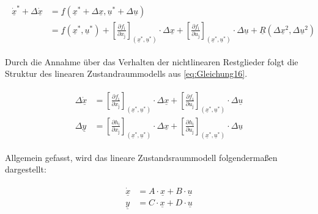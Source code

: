 \documentclass[
	pagesize,
	fontsize=12pt,
	paper=a4,
	oneside,
   reqno
]{scrartcl}
\begin{document}
\begin{align}\label{eq:Gleichung27}
    \begin{split}
        \dot{\underline{x}}^{*}+\Delta{\dot{\underline{x}}} &=\underline{f}(\underline{x}^{*}+\Delta{\underline{x}},\underline{u}^{*}+\Delta{\underline{u}})\\
        &=\underline{f}(\underline{x}^{*},\underline{u}^{*})+\left[\frac{\partial f_{\mathrm{i}}}{\partial x_{\mathrm{j}}}\right]_{(\underline{x}^{*}, \underline{u}^{*})}\cdot\Delta{\underline{x}}+\left[\frac{\partial f_{\mathrm{i}}}{\partial u_{\mathrm{j}}}\right]_{(\underline{x}^{*},\underline{u}^{*})}\cdot\Delta{\underline{u}}+\underline{R}(\Delta{\underline{x}^2}, \Delta{\underline{u}^2})
    \end{split}
\end{align}

Durch die Annahme über das Verhalten der nichtlinearen Restglieder folgt die Struktur des linearen Zustandraummodells aus \autoref{eq:Gleichung16}.

\begin{align}\label{eq:Gleichung28}
    \begin{split}
        \Delta\dot{\underline{x}} &= \left[\frac{\partial f_{\mathrm{i}}}{\partial x_{\mathrm{j}}}\right]_{(\underline{x}^{*}, \underline{u}^{*})}\cdot\Delta{\underline{x}}+\left[\frac{\partial f_{\mathrm{i}}}{\partial u_{\mathrm{j}}}\right]_{(\underline{x}^{*},\underline{u}^{*})}\cdot\Delta{\underline{u}}\\   
        \Delta{\underline{y}} &= \left[\frac{\partial h_{\mathrm{i}}}{\partial x_{\mathrm{j}}}\right]_{(\underline{x}^{*}, \underline{u}^{*})}\cdot\Delta{\underline{x}}+\left[\frac{\partial h_{\mathrm{i}}}{\partial u_{\mathrm{j}}}\right]_{(\underline{x}^{*},\underline{u}^{*})}\cdot\Delta{\underline{u}}
    \end{split}
\end{align}

 Allgemein gefasst, wird das lineare Zustandsraummodell folgendermaßen dargestellt:

\begin{align}\label{eq:Gleichung29}
    \begin{split}
        \dot{\underline{x}} &= A\cdot\underline{x}+B\cdot\underline{u}\\
        \underline{y} &= C\cdot\underline{x}+D\cdot\underline{u}
    \end{split}
\end{align}
\end{document}
